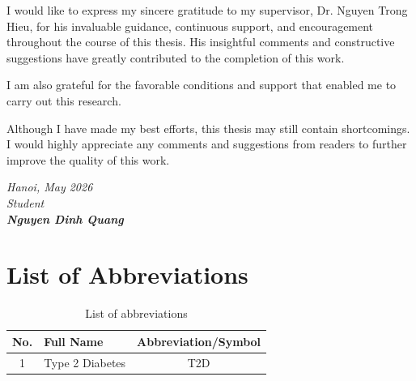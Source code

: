 \documentclass[13pt, a4paper, oneside]{book}
\makeatletter
\def\cleardoublepage{\clearpage\if@twoside \ifodd\c@page\else
    \hbox{}
    \thispagestyle{plain}
    \newpage
    \if@twocolumn\hbox{}\newpage\fi\fi\fi}
\numberwithin{subsection}{section}
\makeatother
\begin{document}
\baselineskip
21pt

I would like to express my sincere gratitude to my supervisor, Dr. Nguyen Trong Hieu, for his invaluable guidance, continuous support, and encouragement throughout the course of this thesis. His insightful comments and constructive suggestions have greatly contributed to the completion of this work.

I am also grateful for the favorable conditions and support that enabled me to carry out this research.

Although I have made my best efforts, this thesis may still contain shortcomings. I would highly appreciate any comments and suggestions from readers to further improve the quality of this work.

\begin{flushright}
	{\it Hanoi, May 2026}\\
        {\it Student}\\
        {\it \textbf{Nguyen Dinh Quang}}
\end{flushright}
\newpage

\cleardoublepage

\chapter*{List of Abbreviations}
\baselineskip
21pt
\begin{table}[h!]
    \centering
    \begin{tabular}{|c|>{\arraybackslash}p{10cm}|c|}
        \hline
        \textbf{No.} & \centering\textbf{Full Name} & \textbf{Abbreviation/Symbol} \\ \hline
        1 & Type 2 Diabetes & T2D \\ \hline
    \end{tabular}
    \caption[]{List of abbreviations}
\end{table}

\newpage

\cleardoublepage

\renewcommand{\contentsname}{Table of Contents} 
\baselineskip 0.6cm
\tableofcontents
\thispagestyle{empty}


\renewcommand{\listfigurename}{List of Figures}
\renewcommand{\listtablename}{List of Tables}
\renewcommand{\figurename}{Figure}
\renewcommand{\tablename}{Table}
\renewcommand{\cftfigpresnum}{Figure~} 
\renewcommand{\cfttabpresnum}{Table~} 
\setlength{\cftfignumwidth}{2cm} 
\setlength{\cfttabnumwidth}{2cm} 
\end{document}
